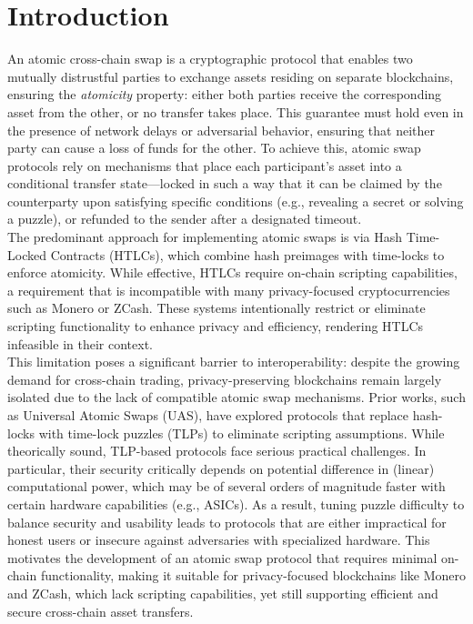 
\section{Introduction}

An atomic cross-chain swap is a cryptographic protocol that enables two mutually distrustful parties to exchange assets residing on separate blockchains, ensuring the \textit{atomicity} property: either both parties receive the corresponding asset from the other, or no transfer takes place. This guarantee must hold even in the presence of network delays or adversarial behavior, ensuring that neither party can cause a loss of funds for the other. To achieve this, atomic swap protocols rely on mechanisms that place each participant’s asset into a conditional transfer state—locked in such a way that it can be claimed by the counterparty upon satisfying specific conditions (e.g., revealing a secret or solving a puzzle), or refunded to the sender after a designated timeout. \\
The predominant approach for implementing atomic swaps is via Hash Time-Locked Contracts (HTLCs), which combine hash preimages with time-locks to enforce atomicity. While effective, HTLCs require on-chain scripting capabilities, a requirement that is incompatible with many privacy-focused cryptocurrencies such as Monero or ZCash. These systems intentionally restrict or eliminate scripting functionality to enhance privacy and efficiency, rendering HTLCs infeasible in their context. \\
This limitation poses a significant barrier to interoperability: despite the growing demand for cross-chain trading, privacy-preserving blockchains remain largely isolated due to the lack of compatible atomic swap mechanisms. Prior works, such as Universal Atomic Swaps (UAS), have explored protocols that replace hash-locks with time-lock puzzles (TLPs) to eliminate scripting assumptions. While theorically sound, TLP-based protocols face serious practical challenges. In particular, their security critically depends on potential difference in (linear) computational power, which may be of several orders of magnitude faster with certain hardware capabilities (e.g., ASICs). As a result, tuning puzzle difficulty to balance security and usability leads to protocols that are either impractical for honest users or insecure against adversaries with specialized hardware.
This motivates the development of an atomic swap protocol that requires minimal on-chain functionality, making it suitable for privacy-focused blockchains like Monero and ZCash, which lack scripting capabilities, yet still supporting efficient and secure cross-chain asset transfers.

